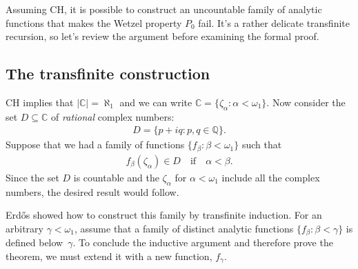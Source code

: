 \documentclass[runningheads]{llncs}
\begin{document}
Assuming CH, it is possible to construct an uncountable family of analytic functions that makes the Wetzel property $P_0$ fail.
It's a rather delicate transfinite recursion, so let's review the argument before examining the formal proof.

\subsection{The transfinite construction}

CH implies that $|\mathbb{C}| = \aleph_1$ and we can write $\mathbb{C} = \{\zeta_\alpha : \alpha < \omega_1 \}$.
Now consider the set $D\subseteq\mathbb{C}$ of \textit{rational} complex numbers: 
\begin{align*}
 D = \{p+iq: p,q\in\mathbb{Q}\}.
\end{align*}
Suppose that we had a family of functions 
 $\{f_\beta : \beta < \omega_1 \}$ such that 
\begin{align}\label{eqn:f_in_D}
	f_\beta (\zeta_\alpha) \in D\quad\text{if}\quad\alpha<\beta.
\end{align} 
 Since the set $D$ is countable and the $\zeta_\alpha$ for $\alpha < \omega_1$ include all the complex numbers, the desired result would follow.

Erd\H{o}s showed how to construct this family by transfinite induction. For an arbitrary $\gamma<\omega_1$, assume that a family of distinct analytic functions $\{f_\beta: \beta<\gamma\}$ is defined below~$\gamma$.
To conclude the inductive argument and therefore prove the theorem, we must extend it with a new function, $f_\gamma$.
\end{document}

